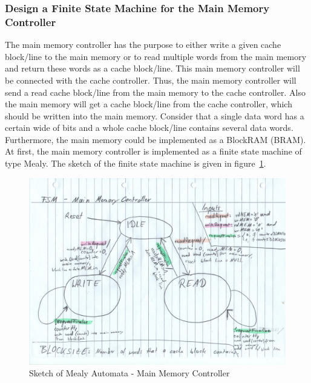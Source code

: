\subsubsection{Design a Finite State Machine for the Main Memory Controller}
The main memory controller has the purpose to either write a given cache block/line to the main memory or to read multiple words from the main memory and return these words as a cache block/line. This main memory controller will be connected with the cache controller. Thus, the main memory controller will send a read cache block/line from the main memory to the cache controller. Also the main memory will get a cache block/line from the cache controller, which should be written into the main memory. Consider that a single data word has a certain wide of bits and a whole cache block/line contains several data words. Furthermore, the main memory could be implemented as a BlockRAM (BRAM). At first, the main memory controller is implemented as a finite state machine of type Mealy. The sketch of the finite state machine is given in figure~\ref{fig:sketchMealyAutomataMainMemoryController}.
\begin{figure}
	\centering
	\includegraphics[scale=.5,angle=270]{pictures/sketch_mealyAutomata_mainMemoryController}
	\caption{Sketch of Mealy Automata - Main Memory Controller}
	\label{fig:sketchMealyAutomataMainMemoryController}
\end{figure}
